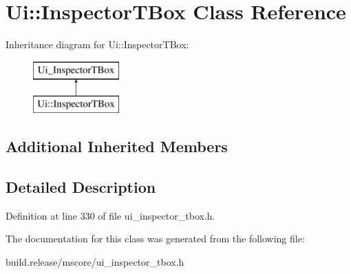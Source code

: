 \hypertarget{class_ui_1_1_inspector_t_box}{}\section{Ui\+:\+:Inspector\+T\+Box Class Reference}
\label{class_ui_1_1_inspector_t_box}
Inheritance diagram for Ui\+:\+:Inspector\+T\+Box\+:\begin{figure}[H]
\begin{center}
\leavevmode
\includegraphics[height=2.000000cm]{class_ui_1_1_inspector_t_box}
\end{center}
\end{figure}
\subsection*{Additional Inherited Members}


\subsection{Detailed Description}


Definition at line 330 of file ui\+\_\+inspector\+\_\+tbox.\+h.



The documentation for this class was generated from the following file\+:\begin{DoxyCompactItemize}
\item 
build.\+release/mscore/ui\+\_\+inspector\+\_\+tbox.\+h\end{DoxyCompactItemize}
